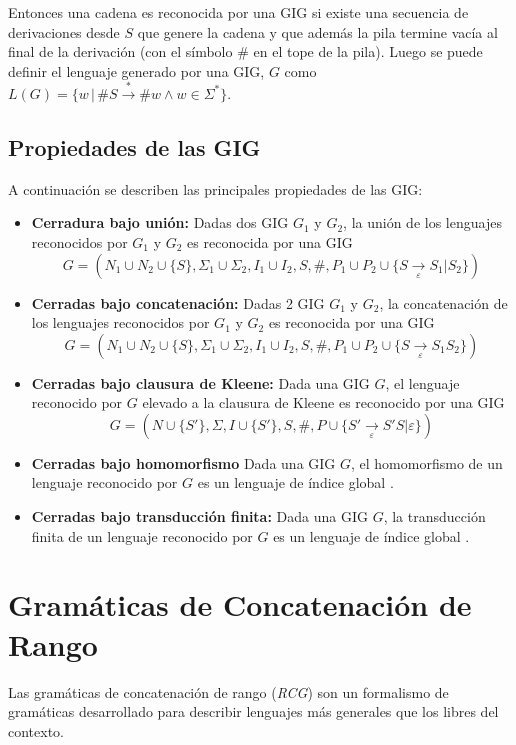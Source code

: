 Entonces una cadena es reconocida por una GIG si existe una secuencia de derivaciones desde $S$ que genere la cadena y que además la pila
termine vacía al final de la derivación (con el símbolo $\#$ en el tope de la pila). Luego se puede definir el lenguaje generado por una GIG, $G$
como $L(G)=\{w\,|\,\#S\overset{*}{\to}\#w \wedge w\in \Sigma^* \}$.

\subsection{Propiedades de las GIG}

A continuación se describen las principales propiedades de las GIG:
\begin{itemize}
    \item \textbf{Cerradura bajo unión:} Dadas dos GIG $G_1$ y $G_2$, la unión de los lenguajes reconocidos por $G_1$ y $G_2$ es reconocida por una GIG
          $$G=(N_1\cup N_2\cup \{S\},\Sigma_1\cup \Sigma_2,I_1\cup I_2,S,\#,P_1\cup P_2\cup \{S \underset{\varepsilon}{\to} S_1|S_2\})$$
    \item \textbf{Cerradas bajo concatenación:} Dadas 2 GIG $G_1$ y $G_2$, la concatenación de los lenguajes reconocidos por $G_1$ y $G_2$ es reconocida por una GIG
          $$G=(N_1\cup N_2\cup \{S\},\Sigma_1\cup \Sigma_2,I_1\cup I_2,S,\#,P_1\cup P_2\cup \{S \underset{\varepsilon}{\to} S_1S_2\})$$
    \item \textbf{Cerradas bajo clausura de Kleene:} Dada una GIG $G$, el lenguaje reconocido por $G$ elevado a la clausura de Kleene es reconocido por una GIG
          $$G=(N\cup \{S'\},\Sigma,I\cup \{S'\},S,\#,P\cup \{S'\underset{\varepsilon}{\to} S'S|\varepsilon\})$$
    \item  \textbf{Cerradas bajo homomorfismo} Dada una GIG $G$, el homomorfismo de un lenguaje reconocido por $G$ es un lenguaje de índice global \cite{globalIndexLanguages}.
    \item  \textbf{Cerradas bajo transducción finita:} Dada una GIG $G$, la transducción finita de un lenguaje reconocido por $G$ es un lenguaje de índice global \cite{globalIndexLanguages}.
\end{itemize}

\section{Gramáticas de Concatenación de Rango}

Las gramáticas de concatenación de rango (\textit{RCG}) \cite{mainRCGBib} son un formalismo de gramáticas desarrollado
para describir lenguajes más generales que los libres del contexto.

